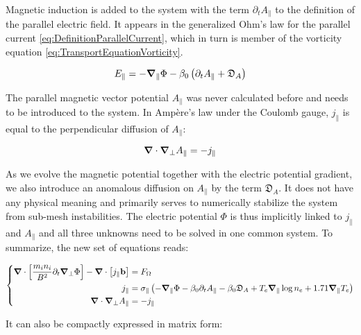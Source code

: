 Magnetic induction is added to the system with the term $\partial_t A_\parallel$ to the definition of the parallel electric field. It appears in the generalized Ohm's law for the parallel current \ref{eq:DefinitionParallelCurrent}, which in turn is member of the vorticity equation \ref{eq:TransportEquationVorticity}.

\begin{equation}
	\label{eq:electricField_eq_gradPhi_p_dtA}
	E_\parallel = -\grad_\parallel\Phi - \beta_0\left(\partial_t A_\parallel + \mathfrak{D}_A\right)
\end{equation}

The parallel magnetic vector potential $A_\parallel$ was never calculated before and needs to be introduced to the system. In Ampère's law under the Coulomb gauge, $j_\parallel$ is equal to the perpendicular diffusion of $A_\parallel$: 

\begin{equation}
	\label{eq:S3X_AmpereLaw}
	\grad\cdot\grad_\perp A_\parallel = -j_\parallel
\end{equation}

As we evolve the magnetic potential together with the electric potential gradient, we also introduce an anomalous diffusion on $A_\parallel$ by the term $\mathfrak{D}_A$. It does not have any physical meaning and primarily serves to numerically stabilize the system from sub-mesh instabilities. The electric potential $\Phi$ is thus implicitly linked to $j_\parallel$ and $A_\parallel$ and all three unknowns need to be solved in one common system. To summarize, the new set of equations reads:

\begin{align}
	\label{eq:S3X_vorticityEquation_MagneticInduction}
		\left\{
	\begin{aligned}
		\grad\cdot\left[\frac{m_i n_i}{ B^2}\partial_t\grad_\perp\Phi\right] - \grad\cdot\left[j_\parallel\mathbf{b}\right]& = F_\Omega \\
		j_\parallel& = \sigma_\parallel \left(-\grad_\parallel\Phi - \beta_0\partial_t A_\parallel - \beta_0\mathfrak{D}_A + T_e\grad_\parallel\log n_e + 1.71\grad_\parallel T_e \right) \\
		\grad\cdot\grad_\perp A_\parallel& = -j_\parallel
	\end{aligned}
	\right.
\end{align}

It can also be compactly expressed in matrix form: 

